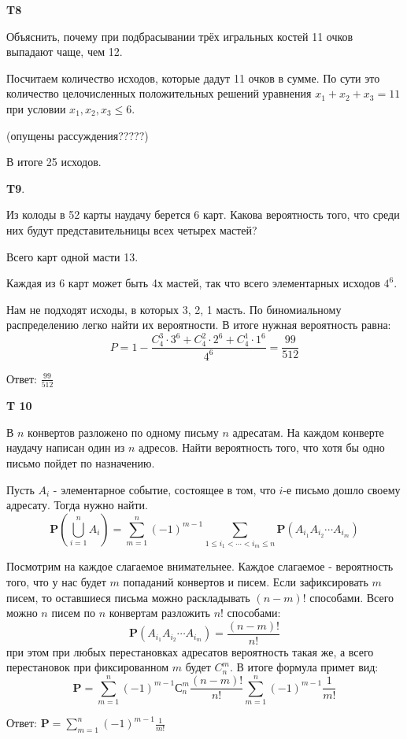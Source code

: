 \documentclass[a4paper,12pt]{article} %
\begin{document}
\begin{example}\textbf{T8}

Объяснить, почему при подбрасывании трёх игральных костей 11 очков выпадают чаще, чем 12.


Посчитаем количество исходов, которые дадут 11 очков в сумме. По сути это количество целочисленных положительных решений уравнения $ x_1+x_2+x_3=11$ при условии $ x_1,x_2,x_3\le 6$.





(опущены рассуждения?????)


В итоге 25 исходов.


\end{example}




\begin{example}\textbf{T9}. 

Из колоды в 52 карты наудачу берется 6 карт. 
Какова вероятность того, что среди них будут представительницы всех четырех мастей?

Всего карт одной масти 13.

Каждая из 6 карт может быть 4х мастей, так что всего элементарных исходов $ 4^6$.

Нам не подходят исходы, в которых 3, 2, 1 масть. По биномиальному распределению легко найти их вероятности. В итоге нужная вероятность равна:
\[ P=1-\frac{C_4^3 \cdot 3^6+C_4^2 \cdot 2^6+C_4^1 \cdot 1^6}{4^6}=\frac{99}{512} \]

Ответ: $ \frac{99}{512} $

\end{example}


\begin{example}\textbf{T 10}

В $n$ конвертов разложено по одному письму $n$ адресатам. 
На каждом конверте наудачу написан один из $n$ адресов. 
Найти вероятность того, что хотя бы одно письмо пойдет по назначению.

Пусть $ A_i$ - элементарное событие, состоящее в том, что $i$-е письмо дошло своему адресату. Тогда нужно найти.
\[ \mathbf{P}(\bigcup_{i=1}^n A_i)= \sum_{m=1}^{n}(-1)^{m-1} \sum_{1 \leqslant i_{1}<\cdots<i_{m} \leqslant n}
 \mathbf{P}\left(A_{i_{1}} A_{i_{2}} \cdots A_{i_{m}}\right) \]

Посмотрим на каждое слагаемое внимательнее. Каждое слагаемое - вероятность того, что у нас будет $m$ попаданий конвертов и писем.
Если зафиксировать $m$ писем, то оставшиеся письма можно раскладывать $(n-m)!$ способами. 
Всего можно $n$ писем по $n$ конвертам разложить $ n!$ способами:
\[ \mathbf{P}\left(A_{i_{1}} A_{i_{2}}\cdots A_{i_{m}}\right)=\frac{(n-m)!}{n!} \]
при этом при любых перестановках адресатов вероятность такая же, а всего перестановок при фиксированном $m$ будет $ C_n^m$.
В итоге формула примет вид:
\[ \mathbf{P}=\sum_{m=1}^{n}(-1)^{m-1} С_n^m \frac{(n-m)!}{n!}
\sum_{m=1}^{n}(-1)^{m-1}\frac{1}{m!} \]

Ответ: $\mathbf{P}= \sum_{m=1}^{n}(-1)^{m-1}\frac{1}{m!} $

\end{example}
\end{document}
